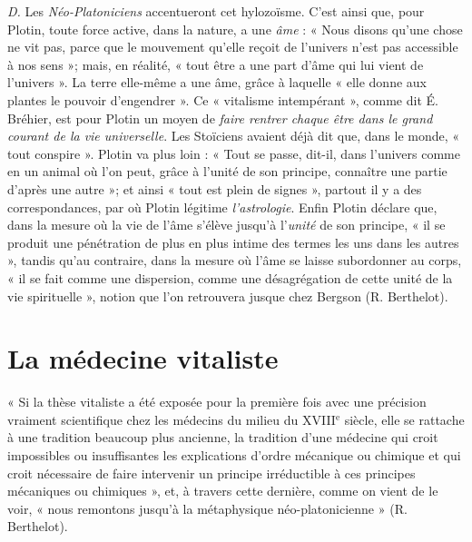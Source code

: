 \vspace{0.24cm}
{\footnotesize {\it D.} Les {\it Néo-Platoniciens} accentueront cet hylozoïsme. C’est ainsi que,
pour Plotin, toute force active, dans la nature, a une \textsf{\textit {âme}} : « Nous disons
qu'une chose ne vit pas, parce que le mouvement qu’elle reçoit de l'univers
n’est pas accessible à nos sens »; mais, en réalité, « tout être a une part
d'âme qui lui vient de l'univers ». La terre elle-même a une âme, grâce à
laquelle « elle donne aux plantes le pouvoir d'engendrer ». Ce « vitalisme
intempérant », comme dit É. Bréhier, est pour Plotin un moyen de {\it faire
rentrer chaque être dans le grand courant de la vie universelle}. Les Stoïciens
avaient déjà dit que, dans le monde, « tout conspire ». Plotin va plus loin :
« Tout se passe, dit-il, dans l'univers comme en un animal où l’on peut, grâce
à l'unité de son principe, connaître une partie d’après une autre »; et ainsi
« tout est plein de signes », partout il y a des correspondances, par où Plotin
légitime {\it l'astrologie}. Enfin Plotin déclare que, dans la mesure où la vie de
l'âme s'élève jusqu’à l'\textsf{\textit {unité}} de son principe, « il se produit une pénétration
de plus en plus intime des termes les uns dans les autres », tandis qu'au
contraire, dans la mesure où l’âme se laisse subordonner au corps, « il se
fait comme une dispersion, comme une désagrégation de cette unité de la
vie spirituelle », notion que l’on retrouvera jusque chez Bergson (R. Berthelot).}
\vspace{0.31cm}

\section{La médecine vitaliste}%
« Si la thèse vitaliste a été
exposée pour la première fois avec une précision vraiment scientifique
chez les médecins du milieu du {\footnotesize XVIII}$^\text{e}$ siècle, elle se rattache à une
tradition beaucoup plus ancienne, la tradition d’une médecine qui
croit impossibles ou insuffisantes les explications d’ordre mécanique
ou chimique et qui croit nécessaire de faire intervenir un principe
irréductible à ces principes mécaniques ou chimiques », et, à travers
cette dernière, comme on vient de le voir, « nous remontons jusqu’à
la métaphysique néo-platonicienne » (R. Berthelot).

